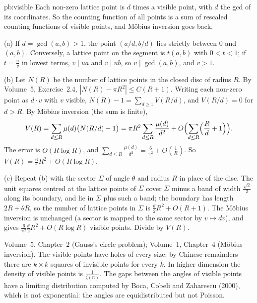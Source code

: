 \begin{solution}{pb:visible}
\idea Each non-zero lattice point is $d$ times a visible point, with $d$ the gcd of its coordinates. So the counting function of all
points is a sum of rescaled counting functions of visible points, and Möbius inversion goes back.

\writeup (a) If $d=\gcd(a,b)>1$, the point $(a/d,b/d)$ lies strictly between $0$ and $(a,b)$. Conversely, a lattice point on the segment
is $t(a,b)$ with $0<t<1$; if $t=\frac uv$ in lowest terms, $v\mid ua$ and $v\mid ub$, so $v\mid\gcd(a,b)$, and $v>1$.

(b) Let $N(R)$ be the number of lattice points in the closed disc of radius $R$. By Volume~5, Exercise~2.4, $|N(R)-\pi R^2|\le C(R+1)$.
Writing each non-zero point as $d\cdot v$ with $v$ visible, $N(R)-1=\sum_{d\ge1}V(R/d)$, and $V(R/d)=0$ for $d>R$. By Möbius inversion
(the sum is finite),
\[
V(R)=\sum_{d\le R}\mu(d)\bigl(N(R/d)-1\bigr)=\pi R^2\sum_{d\le R}\frac{\mu(d)}{d^2}+O\Bigl(\sum_{d\le R}\Bigl(\frac Rd+1\Bigr)\Bigr).
\]
The error is $O(R\log R)$, and $\sum_{d\le R}\frac{\mu(d)}{d^2}=\frac6{\pi^2}+O(\frac1R)$. So $V(R)=\frac6\pi R^2+O(R\log R)$.

(c) Repeat (b) with the sector $\Sigma$ of angle $\theta$ and radius $R$ in place of the disc. The unit squares centred at the lattice
points of $\Sigma$ cover $\Sigma$ minus a band of width $\frac{\sqrt2}2$ along its boundary, and lie in $\Sigma$ plus such a band; the
boundary has length $2R+\theta R$, so the number of lattice points in $\Sigma$ is $\frac\theta2R^2+O(R+1)$. The Möbius inversion is
unchanged (a sector is mapped to the same sector by $v\mapsto dv$), and gives $\frac{6}{\pi^2}\frac\theta2R^2+O(R\log R)$ visible
points. Divide by $V(R)$.

\tools Volume~5, Chapter~2 (Gauss's circle problem); Volume~1, Chapter~4 (Möbius inversion).
\leads The visible points have holes of every size: by Chinese remainders there are $k\times k$ squares of invisible points for every
$k$. In higher dimension the density of visible points is $\frac1{\zeta(n)}$. The gaps between the angles of visible points have a
limiting distribution computed by Boca, Cobeli and Zaharescu (2000), which is not exponential: the angles are equidistributed but
not Poisson.
\end{solution}

